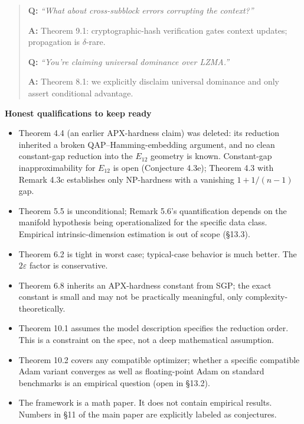 \documentclass[
]{article}
\begin{document}
\begin{quote}
\textbf{Q:} \emph{``What about cross-subblock errors corrupting the
context?''}

\textbf{A:} Theorem 9.1: cryptographic-hash verification gates
context updates; propagation is $\delta$-rare.

\textbf{Q:} \emph{``You're claiming universal dominance over LZMA.''}

\textbf{A:} Theorem 8.1: we explicitly disclaim universal dominance and
only assert conditional advantage.
\end{quote}

\textbf{Honest qualifications to keep ready}

\begin{itemize}
\item Theorem 4.4 (an earlier APX-hardness claim) was deleted: its
reduction inherited a broken QAP--Hamming-embedding argument, and no
clean constant-gap reduction into the $E_{12}$ geometry is known.
Constant-gap inapproximability for $E_{12}$ is open (Conjecture 4.3e);
Theorem 4.3 with Remark 4.3c establishes only NP-hardness with a
vanishing $1+1/(n-1)$ gap.

\item Theorem 5.5 is unconditional; Remark 5.6's quantification
depends on the manifold hypothesis being operationalized for the
specific data class. Empirical intrinsic-dimension estimation is out
of scope (§13.3).

\item Theorem 6.2 is tight in worst case; typical-case behavior is
much better. The $2\varepsilon$ factor is conservative.

\item Theorem 6.8 inherits an APX-hardness constant from SGP; the
exact constant is small and may not be practically meaningful, only
complexity-theoretically.

\item Theorem 10.1 assumes the model description specifies the
reduction order. This is a constraint on the spec, not a deep
mathematical assumption.

\item Theorem 10.2 covers any compatible optimizer; whether a
specific compatible Adam variant converges as well as
floating-point Adam on standard benchmarks is an empirical question
(open in §13.2).

\item The framework is a math paper. It does not contain empirical
results. Numbers in §11 of the main paper are explicitly labeled
as conjectures.
\end{itemize}
\end{document}
